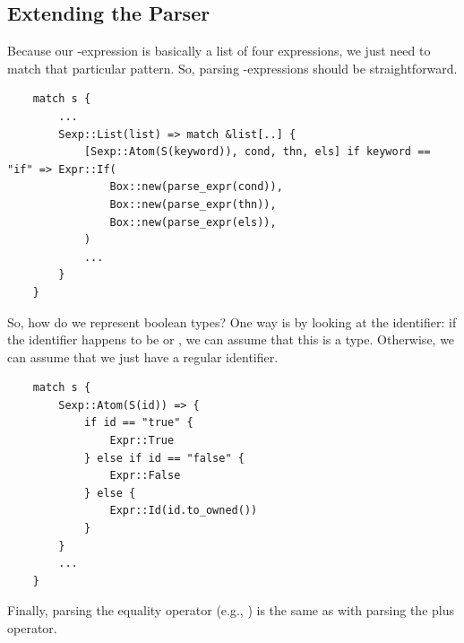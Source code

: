 \documentclass[letterpaper]{article}
\begin{document}
\subsection{Extending the Parser}
Because our -expression is basically a list of four expressions, we just need to match that particular pattern. So, parsing -expressions should be straightforward. 
\begin{verbatim}
    match s {
        ...
        Sexp::List(list) => match &list[..] {
            [Sexp::Atom(S(keyword)), cond, thn, els] if keyword == "if" => Expr::If(
                Box::new(parse_expr(cond)),
                Box::new(parse_expr(thn)),
                Box::new(parse_expr(els)),
            )
            ...    
        }
    }\end{verbatim}
So, how do we represent boolean types? One way is by looking at the identifier: if the identifier happens to be  or , we can assume that this is a  type. Otherwise, we can assume that we just have a regular identifier.
\begin{verbatim}
    match s {
        Sexp::Atom(S(id)) => {
            if id == "true" {
                Expr::True
            } else if id == "false" {
                Expr::False
            } else {
                Expr::Id(id.to_owned())
            }
        }
        ...
    }\end{verbatim}
Finally, parsing the equality operator (e.g., ) is the same as with parsing the plus operator.
\end{document}
